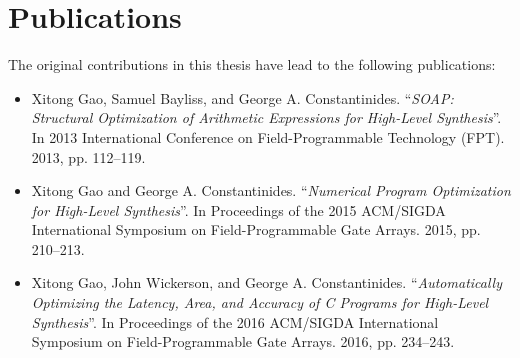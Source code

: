 \section{Publications}
\label{intro:sec:publications}

The original contributions in this thesis have lead to the following
publications:
\begin{itemize}
    \item\cite{soap}
        Xitong Gao, Samuel Bayliss, and George A. Constantinides.
        ``\emph{SOAP\@: Structural Optimization of Arithmetic Expressions
        for High-Level Synthesis}''. In 2013 International Conference on
        Field-Programmable Technology (FPT). 2013, pp. 112–119.

    \item\cite{soap2}
        Xitong Gao and George A. Constantinides. ``\emph{Numerical Program
        Optimization for High-Level Synthesis}''. In Proceedings of the
        2015 ACM/SIGDA International Symposium on Field-Programmable Gate
        Arrays. 2015, pp. 210–213.

    \item\cite{soap3}
        Xitong Gao, John Wickerson, and George A. Constantinides.
        ``\emph{Automatically Optimizing the Latency, Area, and Accuracy
        of C Programs for High-Level Synthesis}''. In Proceedings of the
        2016 ACM/SIGDA International Symposium on Field-Programmable Gate
        Arrays. 2016, pp. 234–243.
\end{itemize}
